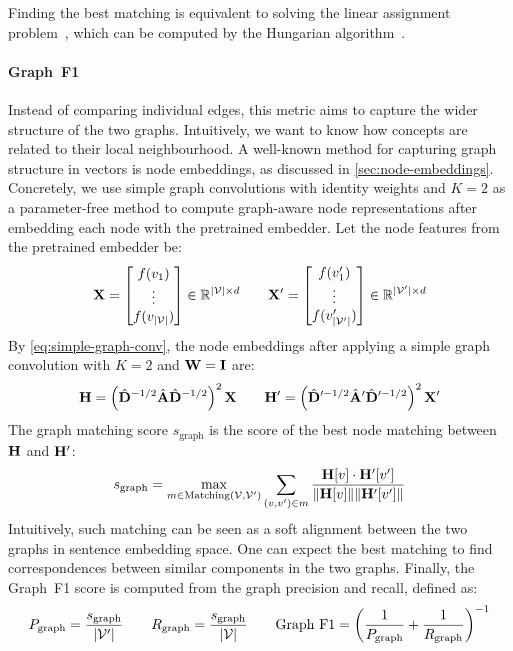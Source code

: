 Finding the best matching is equivalent to solving the linear assignment problem~\cite{martello1987linear}, which can be computed by the Hungarian algorithm~\cite{kuhn1955hungarian}.

\paragraph{Graph~F1}
Instead of comparing individual edges, this metric aims to capture the wider structure of the two graphs. Intuitively, we want to know how concepts are related to their local neighbourhood. A well-known method for capturing graph structure in vectors is node embeddings, as discussed in \cref{sec:node-embeddings}. Concretely, we use simple graph convolutions \cite{wu2019simplifying} with identity weights and $K=2$ as a parameter-free method to compute graph-aware node representations after embedding each node with the pretrained embedder. Let the node features from the pretrained embedder be:
\[
    \mathbf{X} = \begin{bmatrix}
        f(v_1) \\
        \vdots \\
        f(v_{|\mathcal{V}|})
    \end{bmatrix} \in \mathbb{R}^{|\mathcal{V}| \times d} \qquad
    \mathbf{X}' = \begin{bmatrix}
        f(v'_1) \\
        \vdots  \\
        f(v'_{|\mathcal{V}'|})
    \end{bmatrix} \in \mathbb{R}^{|\mathcal{V}'| \times d}
\]
By \cref{eq:simple-graph-conv}, the node embeddings after applying a simple graph convolution with $K = 2$ and $\mathbf{W} = \mathbf{I}$ are:
\[
    \mathbf{H} = \left(\hat{\mathbf{D}}^{-1/2} \hat{\mathbf{A}} \hat{\mathbf{D}}^{-1/2}\right)^2 \mathbf{X} \qquad
    \mathbf{H}' = \left(\hat{\mathbf{D}}'^{-1/2} \hat{\mathbf{A}}' \hat{\mathbf{D}}'^{-1/2}\right)^2 \mathbf{X}'
\]
The graph matching score $s_{\text{graph}}$ is the score of the best node matching between $\mathbf{H}$ and $\mathbf{H}'$:
\[
    s_{\text{graph}} = \max_{m \in \operatorname{Matching}(\mathcal{V}, \mathcal{V}')} \sum_{(v, v') \in m} \frac{\mathbf{H}[v] \cdot \mathbf{H}'[v']}{\|\mathbf{H}[v]\| \|\mathbf{H}'[v']\|}
\]
Intuitively, such matching can be seen as a soft alignment between the two graphs in sentence embedding space. One can expect the best matching to find correspondences between similar components in the two graphs. Finally, the Graph~F1 score is computed from the graph precision and recall, defined as:
\[
    P_{\text{graph}} = \frac{s_{\text{graph}}}{|\mathcal{V}'|} \qquad
    R_{\text{graph}} = \frac{s_{\text{graph}}}{|\mathcal{V}|} \qquad
    \text{Graph~F1} = \left(\frac{1}{P_{\text{graph}}} + \frac{1}{R_{\text{graph}}}\right)^{-1}
\]

